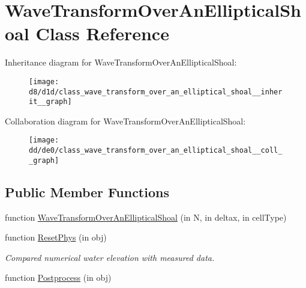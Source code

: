 \hypertarget{class_wave_transform_over_an_elliptical_shoal}{}\section{Wave\+Transform\+Over\+An\+Elliptical\+Shoal Class Reference}
\label{class_wave_transform_over_an_elliptical_shoal}


Inheritance diagram for Wave\+Transform\+Over\+An\+Elliptical\+Shoal\+:
\nopagebreak
\begin{figure}[H]
\begin{center}
\leavevmode
\texttt{[image: d8/d1d/class\_wave\_transform\_over\_an\_elliptical\_shoal\_\_inherit\_\_graph]}
\end{center}
\end{figure}


Collaboration diagram for Wave\+Transform\+Over\+An\+Elliptical\+Shoal\+:
\nopagebreak
\begin{figure}[H]
\begin{center}
\leavevmode
\texttt{[image: dd/de0/class\_wave\_transform\_over\_an\_elliptical\_shoal\_\_coll\_\_graph]}
\end{center}
\end{figure}
\subsection*{Public Member Functions}
\begin{DoxyCompactItemize}
\item 
function \hyperlink{class_wave_transform_over_an_elliptical_shoal_a23776cfe224ccada8067ccdfaeeab188}{Wave\+Transform\+Over\+An\+Elliptical\+Shoal} (in N, in deltax, in cell\+Type)
\item 
function \hyperlink{class_wave_transform_over_an_elliptical_shoal_a9e6d3c6486c279c60905c4d26988d4dd}{Reset\+Phys} (in obj)
\begin{DoxyCompactList}\small\item\em Compared numerical water elevation with measured data. \end{DoxyCompactList}\item 
function \hyperlink{class_wave_transform_over_an_elliptical_shoal_a9b572f2e0f2a3252e3b665cea2cf3f44}{Postprocess} (in obj)
\end{DoxyCompactItemize}
